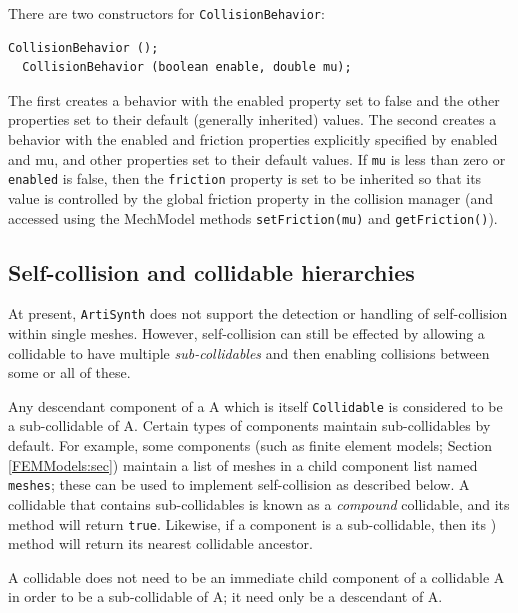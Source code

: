 There are two constructors for {\tt CollisionBehavior}:
%
\begin{lstlisting}[]
  CollisionBehavior ();
  CollisionBehavior (boolean enable, double mu);
\end{lstlisting}
%
The first creates a behavior with the {\sf enabled} property set to
false and the other properties set to their default (generally
inherited) values.  The second creates a behavior with the {\sf
enabled} and {\sf friction} properties explicitly specified by {\sf
enabled} and {\sf mu}, and other properties set to their default
values. If {\tt mu} is less than zero or {\tt enabled} is false, then
the {\tt friction} property is set to be inherited so that its value
is controlled by the global friction property in the collision manager
(and accessed using the MechModel methods {\tt setFriction(mu)} and
{\tt getFriction()}).

\subsection{Self-collision and collidable hierarchies}
\label{SelfCollision:sec}

At present, {\tt ArtiSynth} does not support the detection or handling
of self-collision within single meshes. However, self-collision can
still be effected by allowing a collidable to have multiple {\it
sub-collidables} and then enabling collisions between some or all of
these. 

Any descendant component of a
 A which is itself
{\tt Collidable} is considered to be a sub-collidable of A.  Certain
types of components maintain sub-collidables by default.  For example,
some components (such as finite element models; Section
\ref{FEMModels:sec}) maintain a list of meshes in a child component
list named {\tt meshes}; these can be used to implement self-collision
as described below. A collidable that contains sub-collidables is
known as a {\it compound} collidable, and its
 method
will return {\tt true}. Likewise, if a component is a sub-collidable,
then its
)
method will return its nearest collidable ancestor.

\begin{sideblock}
A collidable does not need to be an immediate child component of a
collidable A in order to be a sub-collidable of A; it need only be a
descendant of A.
\end{sideblock}

